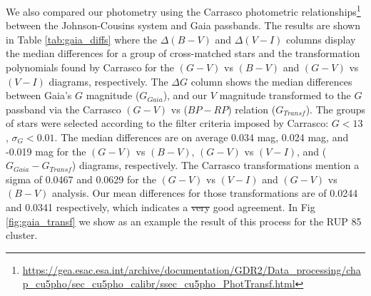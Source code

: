 \documentclass[draft]{aa}
\providecommand{\DIFdeltex}[1]{{\protect\color{red}\sout{#1}}}                      %
\providecommand{\DIFdelbegin}{} %
\providecommand{\DIFdelend}{} %
\providecommand{\DIFdel}[1]{\texorpdfstring{\DIFdeltex{#1}}{}} %
\newcommand{\DIFscaledelfig}{0.5}
\newlength{\DIFdelgraphicswidth} %
\newlength{\DIFdelgraphicsheight} %
\newcommand{\DIFdelincludegraphics}[2][]{%
\sbox{\DIFdelgraphicsbox}{\DIFOincludegraphics[#1]{#2}}%
\settoboxwidth{\DIFdelgraphicswidth}{\DIFdelgraphicsbox} %
\settoboxtotalheight{\DIFdelgraphicsheight}{\DIFdelgraphicsbox} %
\scalebox{\DIFscaledelfig}{%
\parbox[b]{\DIFdelgraphicswidth}{\usebox{\DIFdelgraphicsbox}\\[-\baselineskip] \rule{\DIFdelgraphicswidth}{0em}}\llap{\resizebox{\DIFdelgraphicswidth}{\DIFdelgraphicsheight}{%
\setlength{\unitlength}{\DIFdelgraphicswidth}%
\begin{picture}(1,1)%
\thicklines\linethickness{2pt} %
{\color[rgb]{1,0,0}\put(0,0){\framebox(1,1){}}}%
{\color[rgb]{1,0,0}\put(0,0){\line( 1,1){1}}}%
{\color[rgb]{1,0,0}\put(0,1){\line(1,-1){1}}}%
\end{picture}%
}\hspace*{3pt}}} %
} %
\DeclareRobustCommand{\DIFdelbegin}{\DIFOdelbegin \let\includegraphics\DIFdelincludegraphics} %
\DeclareRobustCommand{\DIFdelend}{\DIFOaddend \let\includegraphics\DIFOincludegraphics} %
\begin{document}
We also compared our photometry using the Carrasco photometric
relationships\footnote{\url{https://gea.esac.esa.int/archive/documentation/GDR2/Data_processing/chap_cu5pho/sec_cu5pho_calibr/ssec_cu5pho_PhotTransf.html}}
between the Johnson-Cousins system and Gaia passbands. The results are shown in
Table \ref{tab:gaia_diffs} where the $\Delta (B-V)$ and $\Delta (V-I)$ columns
display the median differences for a group of cross-matched stars and the
transformation polynomials found by Carrasco for the $(G-V)$ vs $(B-V)$ and
$(G-V)$ vs $(V-I)$ diagrams, respectively. The $\Delta G$ column shows the
median differences between Gaia's $G$ magnitude ($G_{Gaia}$), and our $V$
magnitude transformed to the $G$ passband via the Carrasco $(G-V)$ vs ($BP-RP$)
relation ($G_{Transf}$).
The groups of stars were selected according to the filter
criteria imposed by Carrasco: $G<13$, $\sigma_{G}<0.01$. The median differences
are on average 0.034 mag, 0.024 mag, and -0.019 mag for the $(G-V)$ vs $(B-V)$,
$(G-V)$ vs $(V-I)$, and ($G_{Gaia}-G_{Transf}$) diagrams, respectively.
The Carrasco transformations mention a sigma of 0.0467 and 0.0629 for the
$(G-V)$ vs $(V-I)$ and $(G-V)$ vs $(B-V)$ analysis. Our mean
differences for those transformations are of 0.0244 and 0.0341 respectively,
which indicates a \DIFdelbegin \DIFdel{very }\DIFdelend good agreement. In Fig \ref{fig:gaia_transf} we show as
an example the result of this process for the RUP 85 cluster.\\
\end{document}
